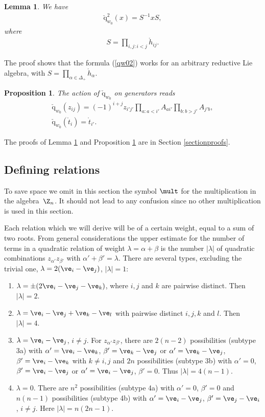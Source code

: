 \documentclass[11pt]{article}
\newtheorem{prop}[theorem]{Proposition}
\newtheorem{lem}[theorem]{Lemma}
\def\nplus{\mathfrak{n}}\def\nn{\nonumber}\def\nin{\noindent}
\def\q{\check{\mathrm q}}\def\Q{\mathrm{Q}}\def\r#1{(\ref{#1})}\let\rf=\r
\def\s{z}\def\S{\mathrm {S}}\def\si{\sigma}\def\Sp{\S^{\nplus}}\def\sy{\acute{\sigma}}\def\th{\mathring{h}}
\def\tphi{A}\def\tpsi{A'}\def\tphiplus{B}\def\tpsiminus{B'}\def\ttphi{B}\def\ttpsi{B'}\def\ts{\hskip1pt}\def\tts{\hskip.5pt}
\def\tt{\mathring{t}}\def\U{\mathrm{U}}\def\Uh{\overline{\U}(\h)}\def\UU{\overline{\U}}\def\UUh{{\cal{D}}(\h)}
\numberwithin{equation}{section}
\begin{document}
\begin{lem}\label{lqw02}
We have
\begin{gather}\label{qw02}
\q_{w_0}^2(x)=S^{-1}xS  ,
\end{gather}
where
\begin{gather}
 S=\prod_{i,j:i<j}\th_{ij}  .\label{conjq02}
 \end{gather}
\end{lem}

The proof shows that the formula \rf{qw02} works for an arbitrary reductive Lie algebra, with $S=\prod_{\alpha\in \Delta_+}\th_{\alpha}$.

\begin{prop}\label{paqw0}
The action of $\q_{w_0}$ on generators reads
\begin{gather}
 \label{3.6}
 \q_{w_0}(\s_{ij})=(-1)^{i+j} \s_{i'j'}\prod_{a:a<i'}\tphi_{ai'}
\prod_{b:b>j'}\tphi_{j'b} ,\\
\q_{w_0}(\tt_i)=\tt_{i'} .\label{3.6a}
\end{gather}
\end{prop}

The proofs of Lemma \ref{lqw02} and Proposition \ref{paqw0} are in Section \ref{sectionproofs}.

\subsection{Def\/ining relations}\label{section3.3}

To save  space we omit in this section the symbol $\mult$ for the multiplication in the algebra~$\Z_n$. It should not lead to any confusion since no other multiplication is used in this section.


Each relation which we will derive will be of a certain weight, equal to a sum of two roots. From general considerations the upper estimate
for the number of terms in a quadratic relation of weight $\lambda=\alpha+\beta$ is the number $|\lambda|$ of quadratic combinations $\s_{\alpha'}\s_{\beta'}$
with $\alpha'+\beta'=\lambda$.
There are several types, excluding the trivial one, $\lambda=2(\ve_i-\ve_j)$, $|\lambda|=1$:
\begin{enumerate}\itemsep=0pt
\item $\lambda=\pm(2\ve_i-\ve_j-\ve_k)$, where $i,j$ and $k$ are pairwise distinct. Then $|\lambda|=2$.
\item $\lambda=\ve_i-\ve_j+\ve_k-\ve_l$ with pairwise distinct $i,j,k$ and $l$. Then $|\lambda|=4$.
\item $\lambda=\ve_i-\ve_j$, $i\neq j$. For $\s_{\alpha'}\s_{\beta'}$, there are $2(n-2)$ possibilities (subtype 3a) with $\alpha'=\ve_i-\ve_k$,
$\beta'=\ve_k-\ve_j$ or $\alpha'=\ve_k-\ve_j$, $\beta'=\ve_i-\ve_k$ with $k\neq i,j$ and $2n$ possibilities (subtype 3b) with $\alpha'=0$,
$\beta'=\ve_i-\ve_j$ or $\alpha'=\ve_i-\ve_j$, $\beta'=0$. Thus $|\lambda|=4(n-1)$.
\item $\lambda=0$. There are $n^2$ possibilities (subtype 4a) with $\alpha'=0$, $\beta'=0$ and $n(n-1)$ possibilities (subtype 4b) with
$\alpha'=\ve_i-\ve_j$,  $\beta'=\ve_j-\ve_i$, $i\neq j$. Here $|\lambda|=n(2n-1)$.
\end{enumerate}
\end{document}
